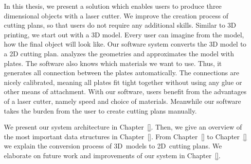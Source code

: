 \documentclass[../ClassicThesis.tex]{subfiles}
\begin{document}
In this thesis, we present a solution which enables users to produce
three dimensional objects with a laser cutter. We improve the creation
process of cutting plans, so that users do not require any additional
skills. Similar to 3D printing, we start out with a 3D model. Every
user can imagine from the model, how the final object will look like.
Our software system {\platener} converts the 3D model to a 2D cutting
plan. {\platener} analyzes the geometries and approximates the model
with plates. The software also knows which materials we want to use.
Thus, it generates all connection between the plates automatically.
The connections are nicely calibrated, meaning all plates fit tight
together without using any glue or other means of attachment. With our
software, users benefit from the advantages of a laser cutter, namely
speed and choice of materials. Meanwhile our software takes the burden
from the user to create cutting plans manually.



We present our system architecture in Chapter~\ref{}. Then, we give an
overview of the most important data structures in Chapter~\ref{}. From
Chapter~\ref{} to Chapter~\ref{} we explain the conversion process of
3D~models to 2D~cutting plans. We elaborate on future work and
improvements of our system in Chapter~\ref{}.
\end{document}
